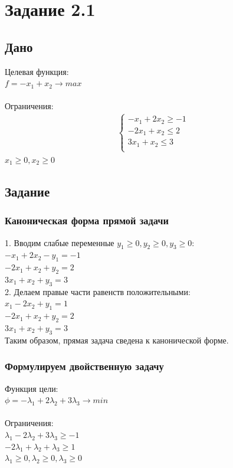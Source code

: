 \documentclass[14pt,a4paper,fleqn]{extarticle}
\begin{document}
\section*{Задание 2.1}
\subsection*{Дано}
Целевая функция:\\
$f = -x_1+x_2 \longrightarrow max$\\\\
Ограничения:
\begin{align*}
	\begin{cases}
		-x_1 + 2x_2 \geq -1\\
		-2x_1 + x_2 \leq 2\\
		3x_1 + x_2 \leq 3\\
	\end{cases}
\end{align*}
$x_1 \geq 0, x_2 \geq 0$
\subsection*{Задание}
\subsubsection*{Каноническая форма прямой задачи}
1. Вводим слабые переменные $y_1 \geq 0, y_2 \geq 0, y_3 \geq 0$:\\
$-x_1 + 2x_2 - y_1 = -1$\\
$-2x_1 + x_2 + y_2 = 2$\\
$3x_1 + x_2 + y_3 = 3$\\

2. Делаем правые части равенств положительными:\\
$x_1 - 2x_2 + y_1 = 1$\\
$-2x_1 + x_2 + y_2 = 2$\\
$3x_1 + x_2 + y_3 = 3$\\

Таким образом, прямая задача сведена к канонической форме.
\newpage
\subsubsection*{Формулируем двойственную задачу}
Функция цели:\\
$\phi = -\lambda_1 + 2\lambda_2 + 3\lambda_3 \longrightarrow min$\\\\
Ограничения:\\
$\lambda_1 - 2\lambda_2 + 3\lambda_3 \geq -1$\\
$-2\lambda_1 + \lambda_2 + \lambda_3 \geq 1$\\
$\lambda_1 \geq 0, \lambda_2 \geq 0, \lambda_3 \geq 0$
\end{document}
